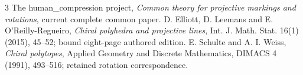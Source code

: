 \documentclass[11pt,a4paper]{article}
\begin{document}
\begin{thebibliography}{3}
 The human\_compression project,
\emph{Common theory for projective markings and rotations}, current complete common paper.
 D. Elliott, D. Leemans and E. O'Reilly-Regueiro,
\emph{Chiral polyhedra and projective lines}, Int. J. Math. Stat.
16(1) (2015), 45--52; bound eight-page authored edition.
 E. Schulte and A. I. Weiss, \emph{Chiral polytopes},
Applied Geometry and Discrete Mathematics, DIMACS 4 (1991), 493--516;
retained rotation correspondence.
\end{thebibliography}
\end{document}
